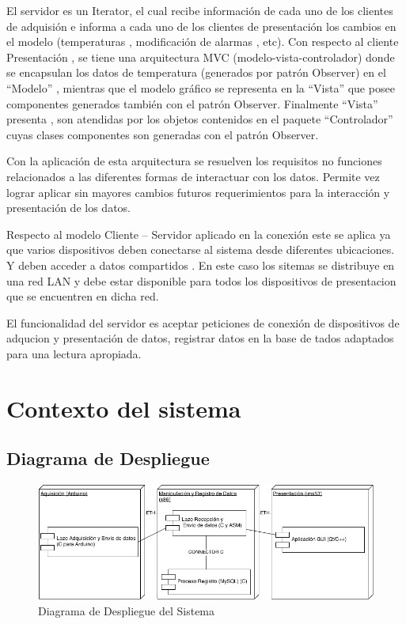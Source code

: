 El servidor es un Iterator, el cual recibe información de cada uno de los
clientes de adquisión e informa a cada uno de los clientes de presentación los
cambios en el modelo (temperaturas , modificación de alarmas , etc).
Con respecto al cliente Presentación , se tiene una arquitectura MVC
(modelo-vista-controlador) donde se encapsulan los datos  de
temperatura (generados por patrón Observer) en el “Modelo” , mientras que el
modelo gráfico se representa en la “Vista” que posee componentes generados
también con el patrón Observer. Finalmente “Vista” presenta , son atendidas por
los objetos contenidos en el paquete “Controlador” cuyas clases componentes son
generadas con el patrón Observer.

Con la aplicación de esta arquitectura se resuelven los requisitos no funciones
relacionados a las diferentes formas de interactuar con los datos.
Permite vez lograr aplicar sin mayores cambios futuros requerimientos para la
interacción y presentación de los datos.

Respecto al modelo Cliente – Servidor aplicado en la conexión este se
aplica ya que varios dispositivos deben conectarse al sistema  desde diferentes
ubicaciones. Y deben acceder a datos compartidos . En este caso los sitemas se
distribuye en una red LAN y debe estar disponible para todos los dispositivos de
presentacion que se encuentren en dicha red.

El funcionalidad del servidor es aceptar peticiones de conexión de dispositivos
de adqucion y presentación de datos, registrar datos en la base de tados
adaptados para una lectura apropiada.

\newpage
\section{\textcolor[gray]{.2}{Contexto del sistema}}
\subsection{\textcolor[gray]{.2}{Diagrama de Despliegue}}
\begin{figure}[h!]
 \begin{center}
  \includegraphics[width=1\textwidth,keepaspectratio=true]{img/Deployement.png}
  \caption{Diagrama de Despliegue del Sistema}
  \label{fig:esquema}
 \end{center}
\end{figure}

